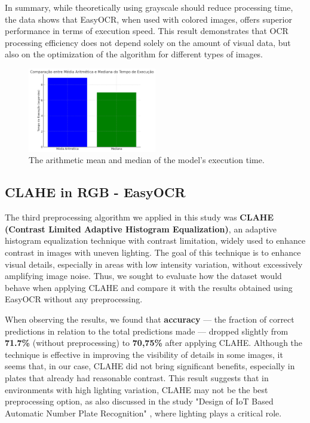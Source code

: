 \documentclass[conference]{IEEEtran}
\begin{document}
	In summary, while theoretically using grayscale should reduce processing time, the data shows that EasyOCR, when used with colored images, offers superior performance in terms of execution speed. This result demonstrates that OCR processing efficiency does not depend solely on the amount of visual data, but also on the optimization of the algorithm for different types of images.
	
	\begin{figure}[htbp]
		\centerline{\includegraphics[width=0.5\textwidth]{img8.png}}
		\caption{The arithmetic mean and median of the model's execution time.}
		\label{img8}
	\end{figure}
	
	
	\subsection{CLAHE in RGB - EasyOCR}
	
	
	The third preprocessing algorithm we applied in this study was \textbf{CLAHE (Contrast Limited Adaptive Histogram Equalization)}, an adaptive histogram equalization technique with contrast limitation, widely used to enhance contrast in images with uneven lighting. The goal of this technique is to enhance visual details, especially in areas with low intensity variation, without excessively amplifying image noise. Thus, we sought to evaluate how the dataset would behave when applying CLAHE and compare it with the results obtained using EasyOCR without any preprocessing.
	
	When observing the results, we found that \textbf{accuracy} — the fraction of correct predictions in relation to the total predictions made — dropped slightly from \textbf{71.7\%} (without preprocessing) to \textbf{70,75\%} after applying CLAHE. Although the technique is effective in improving the visibility of details in some images, it seems that, in our case, CLAHE did not bring significant benefits, especially in plates that already had reasonable contrast. This result suggests that in environments with high lighting variation, CLAHE may not be the best preprocessing option, as also discussed in the study "Design of IoT Based Automatic Number Plate Recognition" \cite{b10}, where lighting plays a critical role.
	
\end{document}
